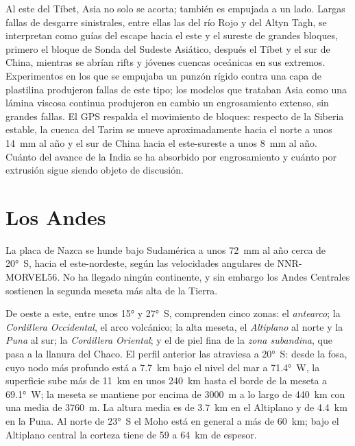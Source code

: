 Al este del Tíbet, Asia no solo se acorta; también es empujada a un lado. Largas fallas de desgarre
sinistrales, entre ellas las del río Rojo y del Altyn Tagh, se interpretan como guías del
escape hacia el este y el sureste de grandes bloques, primero el bloque de Sonda del Sudeste Asiático,
después el Tíbet y el sur de China, mientras se abrían rifts y jóvenes cuencas oceánicas en sus extremos.
Experimentos en los que se empujaba un punzón rígido contra una capa de plastilina produjeron fallas de este tipo;
los modelos que trataban Asia como una lámina viscosa continua produjeron en cambio un engrosamiento extenso, sin
grandes fallas. El GPS respalda el movimiento de bloques: respecto de la Siberia estable, la cuenca del
Tarim se mueve aproximadamente hacia el norte a unos \qty{14}{mm} al año y el sur de China hacia el este-sureste
a unos \qty{8}{mm} al año. Cuánto del avance de la India se ha absorbido por engrosamiento y cuánto
por extrusión sigue siendo objeto de discusión.

\section{Los Andes}\label{sec:b2:himalaya-andes:andes}

La placa de Nazca se hunde bajo Sudamérica a unos \qty{72}{mm} al año cerca de
\ang{20}~S, hacia el este-nordeste, según las velocidades angulares de NNR-MORVEL56. No ha llegado
ningún continente, y sin embargo los Andes Centrales sostienen la segunda meseta más alta de la Tierra.

De oeste a este, entre unos \ang{15} y \ang{27}~S, comprenden cinco zonas: el
\emph{antearco}; la \emph{Cordillera Occidental}, el arco volcánico; la alta meseta, el
\emph{Altiplano} al norte y la \emph{Puna} al sur; la \emph{Cordillera
Oriental}; y el  de piel fina de la \emph{zona subandina}, que
pasa a la llanura del Chaco. El perfil anterior las atraviesa a \ang{20}~S: desde la fosa,
cuyo nodo más profundo está a \qty{7.7}{km} bajo el nivel del mar a \ang{71.4}~W, la superficie sube
más de \qty{11}{km} en unos \qty{240}{km} hasta el borde de la meseta a \ang{69.1}~W;
la meseta se mantiene por encima de \qty{3000}{m} a lo largo de \qty{440}{km} con una
media de \qty{3760}{m}. La altura media es de \qty{3.7}{km} en el Altiplano y de \qty{4.4}{km} en
la Puna. Al norte de \ang{23}~S el Moho está en general a más de \qty{60}{km}; bajo el
Altiplano central la corteza tiene de 59 a \qty{64}{km} de espesor.

